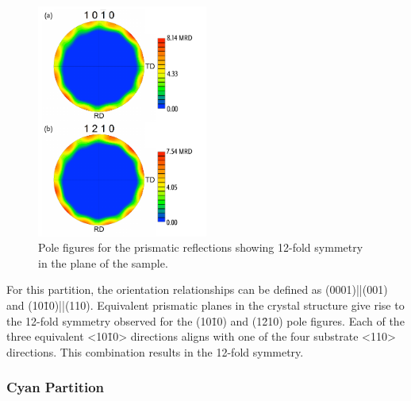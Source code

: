 \begin{figure}
	\centering
	\includegraphics[width=0.5\textwidth]{redinplanepole.pdf}
	\caption[Pole figures for prismatic reflections]{%
		Pole figures for the prismatic reflections showing 12-fold 
		symmetry in the plane of the sample.}
	\label{fig:redinplanepole}
\end{figure}
For this partition, the orientation relationships can be defined as
(0001)||(001) and (10\={1}0)||(110). Equivalent
prismatic planes in the  crystal structure give rise to the 12-fold symmetry
observed for the (10\={1}0) and (1\={2}10) pole figures. Each of the three equivalent
<10\={1}0> directions aligns with one of the four substrate <110> directions. This
combination results in the 12-fold symmetry.


\subsubsection{Cyan Partition}
\label{subsubsec:single.growth.cyan}



%
%
			
